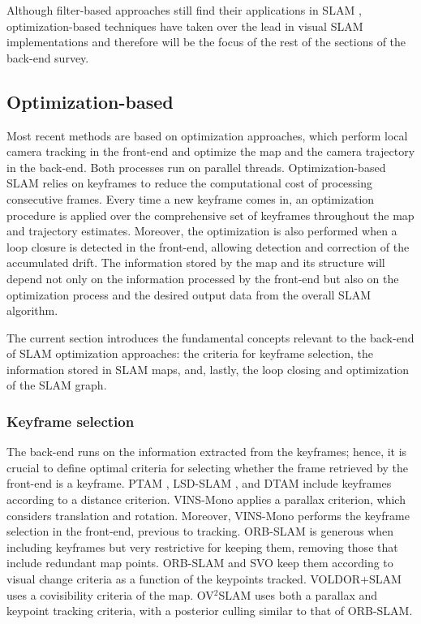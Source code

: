 Although filter-based approaches still find their applications in SLAM \cite{geneva2019SEVIS,quan2019accurate,heo2018ekf,geneva2019linear}, optimization-based techniques have taken over the lead in visual SLAM implementations and therefore will be the focus of the rest of the sections of the back-end survey.

\subsection{Optimization-based}
\label{sec:backend:optbased}
Most recent methods are based on optimization approaches, which perform local camera tracking in the front-end and optimize the map and the camera trajectory in the back-end. Both processes run on parallel threads. 
Optimization-based SLAM relies on keyframes to reduce the computational cost of processing consecutive frames. Every time a new keyframe comes in, an optimization procedure is applied over the comprehensive set of keyframes throughout the map and trajectory estimates.
Moreover, the optimization is also performed when a loop closure is detected in the front-end, allowing detection and correction of the accumulated drift.
The information stored by the map and its structure will depend not only on the information processed by the front-end but also on the optimization process and the desired output data from the overall SLAM algorithm.

The current section introduces the fundamental concepts relevant to the back-end of SLAM optimization approaches: the criteria for keyframe selection, the information stored in SLAM maps, and, lastly, the loop closing and optimization of the SLAM graph.

\subsubsection{Keyframe selection}
\label{sec:backend:keyframeselection}
The back-end runs on the information extracted from the keyframes; hence, it is crucial to define optimal criteria for selecting whether the frame retrieved by the front-end is a keyframe.
PTAM \cite{klein2007ptam}, LSD-SLAM \cite{engel2014lsd}, and DTAM \cite{klein2007dtam} include keyframes according to a distance criterion. VINS-Mono \cite{qin2018vins-mono} applies a parallax criterion, which considers translation and rotation. Moreover, VINS-Mono performs the keyframe selection in the front-end, previous to tracking.
ORB-SLAM \cite{campos2021orb} is generous when including keyframes but very restrictive for keeping them, removing those that include redundant map points. ORB-SLAM and SVO \cite{forster2014svo} keep them according to visual change criteria as a function of the keypoints tracked. VOLDOR+SLAM \cite{min2021voldor+} uses a covisibility criteria of the map. OV$^2$SLAM \cite{ferrera2021ov2slam} uses both a parallax and keypoint tracking criteria, with a posterior culling similar to that of ORB-SLAM.

